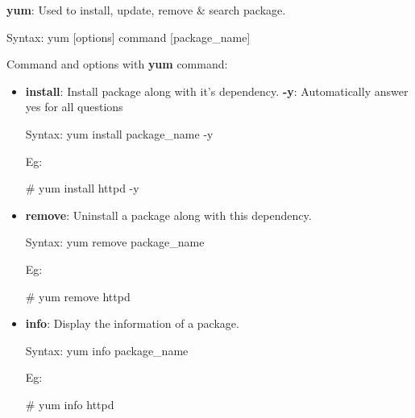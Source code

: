 \setlength{\columnsep}{3pt}
\begin{flushleft}
	\bigskip
	
	\textbf{yum}: Used to install, update, remove \& search package.
	\begin{tcolorbox}[breakable,notitle,boxrule=-0pt,colback=pink,colframe=pink]
		\color{black}
		\font=9pt
		Syntax: yum [options] command [package\_name]
		\font=4pt
	\end{tcolorbox}
	Command and options with \textbf{yum} command:
	
	\begin{itemize}
		\item \textbf{install}: Install package along with it's dependency.
		\newline
		\textbf{-y}: Automatically answer yes for all questions
		\begin{tcolorbox}[breakable,notitle,boxrule=-0pt,colback=pink,colframe=pink]
			\color{black}
			\font=9pt
			Syntax: yum install package\_name -y
			\font=4pt
		\end{tcolorbox}
		Eg:
		\begin{tcolorbox}[breakable,notitle,boxrule=-0pt,colback=black,colframe=black]
			\color{green}
			\font=9pt
			\# yum install httpd -y
			\font=4pt
		\end{tcolorbox}
		\bigskip
		\bigskip
		\item \textbf{remove}: Uninstall a package along with this dependency.
		\begin{tcolorbox}[breakable,notitle,boxrule=-0pt,colback=pink,colframe=pink]
			\color{black}
			\font=9pt
			Syntax: yum remove package\_name 
			\font=4pt
		\end{tcolorbox}
		Eg:
		\begin{tcolorbox}[breakable,notitle,boxrule=-0pt,colback=black,colframe=black]
			\color{green}
			\font=9pt
			\# yum remove httpd
			\font=4pt
		\end{tcolorbox}
		\bigskip
		\bigskip		
		
		\item \textbf{info}: Display the information of a package.
		\begin{tcolorbox}[breakable,notitle,boxrule=-0pt,colback=pink,colframe=pink]
			\color{black}
			\font=9pt
			Syntax: yum info package\_name 
			\font=4pt
		\end{tcolorbox}
		Eg:
		\begin{tcolorbox}[breakable,notitle,boxrule=-0pt,colback=black,colframe=black]
			\color{green}
			\font=9pt
			\# yum info httpd
			\font=4pt
		\end{tcolorbox}
		\bigskip
		\bigskip		


\end{itemize}
\end{flushleft}
